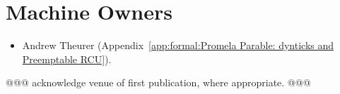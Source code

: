 \section*{Machine Owners}

\begin{itemize}
\item	Andrew Theurer
	(Appendix~\ref{app:formal:Promela Parable: dynticks and Preemptable RCU}).
\end{itemize}

@@@ acknowledge venue of first publication, where appropriate. @@@
